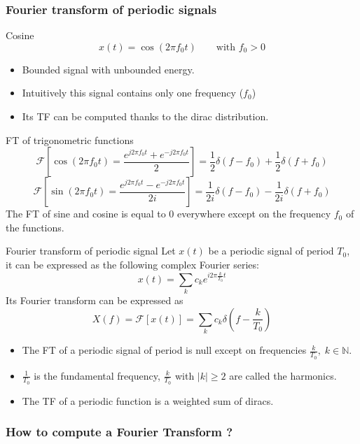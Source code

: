 \frametitle{Fourier transform of periodic signals}


\begin{block}{Cosine}
$$
x(t)= \cos(2 \pi f_0 t) \quad \quad \text{with } f_0 > 0
$$
  \begin{itemize}
  \item Bounded signal with unbounded energy.
  \item Intuitively this signal contains only one frequency ($f_0$)
  \item Its TF can be computed thanks to the dirac distribution.
  \end{itemize}
\end{block}
\begin{block}{FT of trigonometric functions}
  $$
\mathcal{F}\left[\cos(2 \pi f_0 t) = \frac{e^{j2\pi f_0t} + e^{-j2\pi f_0t} }{2}\right]
= %
\frac{1}{2}\delta(f-f_0) + \frac{1}{2}\delta(f+f_0) 
$$
$$
\mathcal{F}\left[\sin(2 \pi f_0 t) = \frac{e^{j2\pi f_0t} - e^{-j2\pi f_0t} }{2i}\right]
= %
\frac{1}{2i}\delta(f-f_0) - \frac{1}{2i}\delta(f+f_0) 
$$
The FT of sine and cosine is equal to $0$ everywhere except on the frequency $f_0$ of the functions.
\end{block}




\begin{block}{Fourier transform of periodic signal}
    Let $x(t)$ be a periodic signal of period $T_0$, it can be expressed as the following complex Fourier series:
    $$x(t)= \sum_k c_k e^{i 2 \pi \frac{k}{T_0}t} $$
    Its Fourier transform can be expressed as 
    $$
  X(f)=\mathcal{F}[x(t)]= %
  \sum_k c_k \delta\left(f-\frac{k}{T_0}\right)
    $$
    \begin{itemize}
      \item The FT of a periodic signal of period is null except on frequencies $\frac{k}{T_0},\;k\in\mathbb{N}$.
      \item $\frac{1}{T_0}$ is the fundamental frequency, $\frac{k}{T_0}$ with $|k|\geq 2$ are called the harmonics.
      \item The TF of a periodic function is a weighted sum of diracs.
      \end{itemize}
  \end{block}


  \frametitle{How to compute a Fourier Transform ?}

